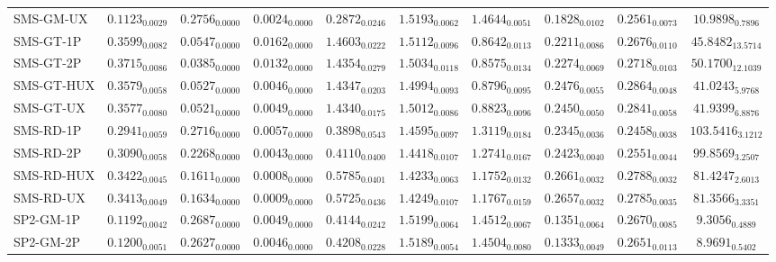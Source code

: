 \begin{longtable}{@{}lccccccccc@{}}
SMS-GM-UX & $0.1123_{0.0029}$ & $0.2756_{0.0000}$ & $0.0024_{0.0000}$ & $0.2872_{0.0246}$ & $1.5193_{0.0062}$ & $1.4644_{0.0051}$ & $0.1828_{0.0102}$ & $0.2561_{0.0073}$ & $10.9898_{0.7896}$ \\
SMS-GT-1P & $0.3599_{0.0082}$ & $0.0547_{0.0000}$ & $0.0162_{0.0000}$ & $1.4603_{0.0222}$ & $1.5112_{0.0096}$ & $0.8642_{0.0113}$ & $0.2211_{0.0086}$ & $0.2676_{0.0110}$ & $45.8482_{13.5714}$ \\
SMS-GT-2P & $0.3715_{0.0086}$ & $0.0385_{0.0000}$ & $0.0132_{0.0000}$ & $1.4354_{0.0279}$ & $1.5034_{0.0118}$ & $0.8575_{0.0134}$ & $0.2274_{0.0069}$ & $0.2718_{0.0103}$ & $50.1700_{12.1039}$ \\
SMS-GT-HUX & $0.3579_{0.0058}$ & $0.0527_{0.0000}$ & $0.0046_{0.0000}$ & $1.4347_{0.0203}$ & $1.4994_{0.0093}$ & $0.8796_{0.0095}$ & $0.2476_{0.0055}$ & $\mathbf{0.2864}_{0.0048}$ & $41.0243_{5.9768}$ \\
SMS-GT-UX & $0.3577_{0.0080}$ & $0.0521_{0.0000}$ & $0.0049_{0.0000}$ & $1.4340_{0.0175}$ & $1.5012_{0.0086}$ & $0.8823_{0.0096}$ & $0.2450_{0.0050}$ & $\mathbf{0.2841}_{0.0058}$ & $41.9399_{6.8876}$ \\
SMS-RD-1P & $0.2941_{0.0059}$ & $0.2716_{0.0000}$ & $0.0057_{0.0000}$ & $0.3898_{0.0543}$ & $1.4595_{0.0097}$ & $1.3119_{0.0184}$ & $0.2345_{0.0036}$ & $0.2458_{0.0038}$ & $103.5416_{3.1212}$ \\
SMS-RD-2P & $0.3090_{0.0058}$ & $0.2268_{0.0000}$ & $0.0043_{0.0000}$ & $0.4110_{0.0400}$ & $1.4418_{0.0107}$ & $1.2741_{0.0167}$ & $0.2423_{0.0040}$ & $0.2551_{0.0044}$ & $99.8569_{3.2507}$ \\
SMS-RD-HUX & $0.3422_{0.0045}$ & $0.1611_{0.0000}$ & $\mathbf{0.0008}_{0.0000}$ & $0.5785_{0.0401}$ & $1.4233_{0.0063}$ & $1.1752_{0.0132}$ & $\mathbf{0.2661}_{0.0032}$ & $0.2788_{0.0032}$ & $81.4247_{2.6013}$ \\
SMS-RD-UX & $0.3413_{0.0049}$ & $0.1634_{0.0000}$ & $\mathbf{0.0009}_{0.0000}$ & $0.5725_{0.0436}$ & $1.4249_{0.0107}$ & $1.1767_{0.0159}$ & $\mathbf{0.2657}_{0.0032}$ & $0.2785_{0.0035}$ & $81.3566_{3.3351}$ \\
SP2-GM-1P & $0.1192_{0.0042}$ & $0.2687_{0.0000}$ & $0.0049_{0.0000}$ & $0.4144_{0.0242}$ & $1.5199_{0.0064}$ & $1.4512_{0.0067}$ & $0.1351_{0.0064}$ & $0.2670_{0.0085}$ & $9.3056_{0.4889}$ \\
SP2-GM-2P & $0.1200_{0.0051}$ & $0.2627_{0.0000}$ & $0.0046_{0.0000}$ & $0.4208_{0.0228}$ & $1.5189_{0.0054}$ & $1.4504_{0.0080}$ & $0.1333_{0.0049}$ & $0.2651_{0.0113}$ & $8.9691_{0.5402}$ \\

\end{longtable}
